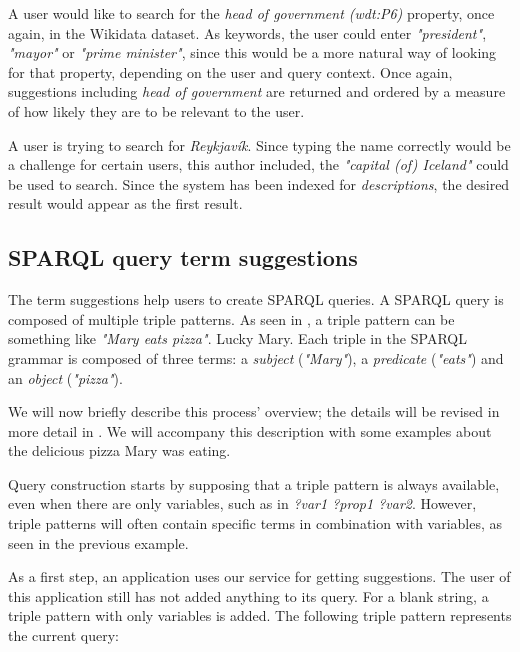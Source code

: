 \begin{example}
A user would like to search for the \textit{head of government (wdt:P6)}  property, once again, in the Wikidata dataset. 
As keywords, the user could enter \textit{"president"}, \textit{"mayor"} or \textit{"prime minister"}, since this would be a more natural way of looking for that property, depending on the user and query context. Once again, suggestions including \textit{head of government} are returned and ordered by a measure of how likely they are to be relevant to the user.
\end{example}

\begin{example}
A user is trying to search for \textit{Reykjavík}. 
Since typing the name correctly would be a challenge for certain users, this author included, the \textit{"capital (of) Iceland"} could be used to search. 
Since the system has been indexed for \textit{descriptions}, the desired result would appear as the first result. 
\end{example}

\subsection{SPARQL query term suggestions}

The term suggestions help users to create SPARQL queries. 
A SPARQL query is composed of multiple triple patterns.
As seen in , a triple pattern can be something like \textit{"Mary eats pizza"}. 
Lucky Mary. 
Each triple in the SPARQL grammar is composed of three terms: 
a \textit{subject} (\textit{"Mary"}), 
a \textit{predicate} (\textit{"eats"}) 
and an \textit{object} (\textit{"pizza"}). 

We will now briefly describe this process' overview; the details will be revised in more detail in . 
We will accompany this description with some examples about the delicious pizza Mary was eating.

Query construction starts by supposing that a triple pattern is always available, even when there are only variables, such as in \textit{?var1 ?prop1 ?var2}. However, triple patterns will often contain specific terms in combination with variables, as seen in the previous example.

As a first step, an application uses our service for getting suggestions. 
The user of this application still has not added anything to its query. 
For a blank string, a triple pattern with only variables is added. 
The following triple pattern represents the current query:

